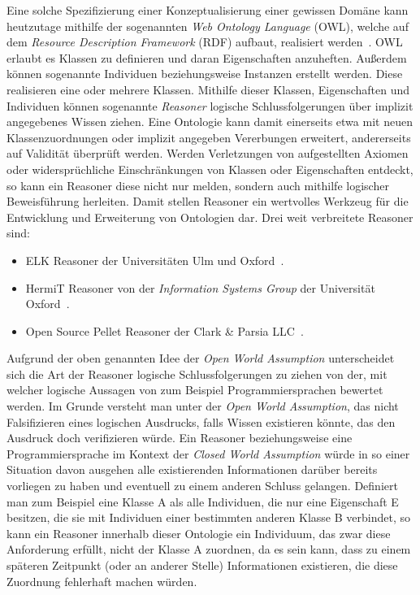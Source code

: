 Eine solche \glqq{}Spezifizierung einer Konzeptualisierung\grqq{} einer gewissen Domäne kann heutzutage mithilfe der sogenannten \textit{Web Ontology Language} (OWL), welche auf dem \textit{Resource Description Framework} (RDF) aufbaut, realisiert werden~\cite{OWL_W3C}\cite{RDF_W3C}.
OWL erlaubt es Klassen zu definieren und daran Eigenschaften anzuheften.
Außerdem können sogenannte Individuen beziehungsweise Instanzen erstellt werden.
Diese realisieren eine oder mehrere Klassen.
Mithilfe dieser Klassen, Eigenschaften und Individuen können sogenannte \textit{Reasoner} logische Schlussfolgerungen über implizit angegebenes Wissen ziehen.
Eine Ontologie kann damit einerseits etwa mit neuen Klassenzuordnungen oder implizit angegeben Vererbungen erweitert, andererseits auf Validität überprüft werden.
Werden Verletzungen von aufgestellten Axiomen oder widersprüchliche Einschränkungen von Klassen oder Eigenschaften entdeckt, so kann ein Reasoner diese nicht nur melden, sondern auch mithilfe logischer Beweisführung herleiten.
Damit stellen Reasoner ein wertvolles Werkzeug für die Entwicklung und Erweiterung von Ontologien dar.
Drei weit verbreitete Reasoner sind: 
\begin{itemize}
  \item ELK Reasoner der Universitäten Ulm und Oxford~\cite{Kazakov2014}.
  \item HermiT Reasoner von der \textit{Information Systems Group} der Universität Oxford~\cite{Glimm2014}\cite{HermitReasoner:online}.
  \item Open Source Pellet Reasoner der Clark \& Parsia LLC~\cite{Sirin2007}. 
\end{itemize}
Aufgrund der oben genannten Idee der \textit{Open World Assumption} unterscheidet sich die Art der Reasoner logische Schlussfolgerungen zu ziehen von der, mit welcher logische Aussagen von zum Beispiel Programmiersprachen bewertet werden.
Im Grunde versteht man unter der \textit{Open World Assumption}, das nicht Falsifizieren eines logischen Ausdrucks, falls Wissen existieren könnte, das den Ausdruck doch verifizieren würde.
Ein Reasoner beziehungsweise eine Programmiersprache im Kontext der \textit{Closed World Assumption} würde in so einer Situation davon ausgehen alle existierenden Informationen darüber bereits vorliegen zu haben und eventuell zu einem anderen Schluss gelangen.
Definiert man zum Beispiel eine Klasse A als alle Individuen, die nur eine Eigenschaft E besitzen, die sie mit Individuen einer bestimmten anderen Klasse B verbindet, so kann ein Reasoner innerhalb dieser Ontologie ein Individuum, das zwar diese Anforderung erfüllt, nicht der Klasse A zuordnen, da es sein kann, dass zu einem späteren Zeitpunkt (oder an anderer Stelle) Informationen existieren, die diese Zuordnung fehlerhaft machen würden.
